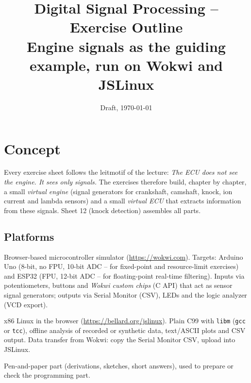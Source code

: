 \documentclass[11pt,a4paper]{article}
\title{Digital Signal Processing -- Exercise Outline\\
\large Engine signals as the guiding example, run on Wokwi and JSLinux}
\author{}
\date{Draft, \today}
\newcommand{\W}{\textsf{\textbf{[Wokwi]}}}
\newcommand{\J}{\textsf{\textbf{[JSLinux]}}}
\newcommand{\Pap}{\textsf{\textbf{[Paper]}}}
\newcommand{\ecu}{\emph{The ECU does not see the engine. It sees only signals.}}
\begin{document}
\maketitle

\section*{Concept}

Every exercise sheet follows the leitmotif of the lecture: \ecu{}
The exercises therefore build, chapter by chapter, a small \emph{virtual
engine} (signal generators for crankshaft, camshaft, knock, ion current and
lambda sensors) and a small \emph{virtual ECU} that extracts information
from these signals. Sheet 12 (knock detection) assembles all parts.

\subsection*{Platforms}
\begin{description}[leftmargin=1.5em]
  \item[\W] Browser-based microcontroller simulator
    (\url{https://wokwi.com}). Targets: Arduino Uno (8-bit, no FPU, 10-bit
    ADC -- for fixed-point and resource-limit exercises) and ESP32 (FPU,
    12-bit ADC -- for floating-point real-time filtering). Inputs via
    potentiometers, buttons and \emph{Wokwi custom chips} (C API) that act
    as sensor signal generators; outputs via Serial Monitor (CSV), LEDs and
    the logic analyzer (VCD export).
  \item[\J] x86 Linux in the browser (\url{https://bellard.org/jslinux}).
    Plain C99 with \texttt{libm} (\texttt{gcc} or \texttt{tcc}), offline
    analysis of recorded or synthetic data, text/ASCII plots and CSV output.
    Data transfer from Wokwi: copy the Serial Monitor CSV, upload into
    JSLinux.
  \item[\Pap] Pen-and-paper part (derivations, sketches, short answers),
    used to prepare or check the programming part.
\end{description}
\end{document}

